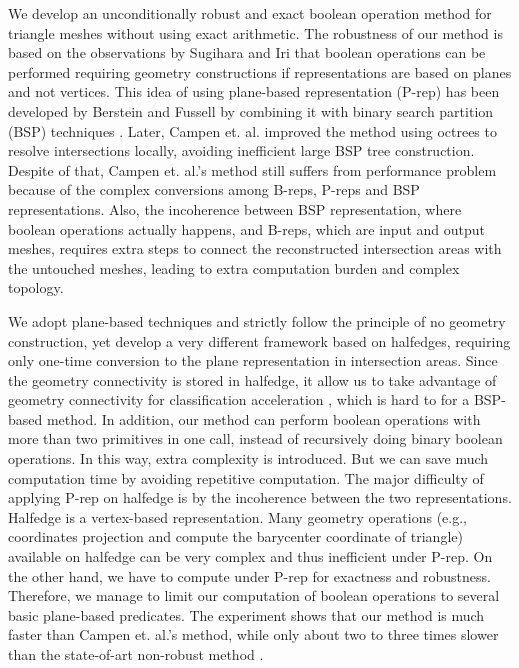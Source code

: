 \documentclass[10pt,journal,compsoc]{IEEEtran}
\begin{document}
We develop an unconditionally robust and exact boolean operation method for triangle meshes without using exact arithmetic. The robustness of our method is based on the observations by Sugihara and Iri \cite{sugihara1990solid} that boolean operations can be performed requiring geometry constructions if representations are based on planes and not vertices. This idea of using plane-based representation (P-rep) has been developed by Berstein and Fussell \cite{bernstein2009fast} by combining it with binary search partition (BSP) techniques \cite{naylor1990merging,thibault1987set}. Later, Campen et. al. \cite{campen2010exact} improved the method using octrees to resolve intersections locally, avoiding inefficient large BSP tree construction. Despite of that, Campen et. al.'s method still suffers from performance problem because of the complex conversions among B-reps, P-reps and BSP representations. Also, the incoherence between BSP representation, where boolean operations actually happens, and B-reps, which are input and output meshes, requires extra steps to connect the reconstructed intersection areas with the untouched meshes, leading to extra computation burden and complex topology.

We adopt plane-based techniques and strictly follow the principle of no geometry construction, yet develop a very different framework based on halfedges, requiring only one-time conversion to the plane representation in intersection areas. Since the geometry connectivity is stored in halfedge, it allow us to take advantage of geometry connectivity for classification acceleration \cite{feito2013fast,ogayar2015deferred,updegrove2016boolean}, which is hard to for a BSP-based method. In addition, our method can perform boolean operations with more than two primitives in one call, instead of recursively doing binary boolean operations. In this way, extra complexity is introduced. But we can save much computation time by avoiding repetitive computation. The major difficulty of applying P-rep on halfedge is by the incoherence between the two representations. Halfedge is a vertex-based representation. Many geometry operations (e.g., coordinates projection and compute the barycenter coordinate of triangle) available on halfedge can be very complex and thus inefficient under P-rep. On the other hand, we have to compute under P-rep for exactness and robustness. Therefore, we manage to limit our computation of boolean operations to several basic plane-based predicates. The experiment shows that our method is much faster than Campen et. al.'s method, while only about two to three times slower than the state-of-art non-robust method \cite{douze2015quickcsg}.
\end{document}
